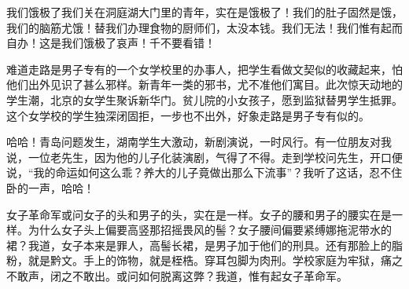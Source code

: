 我们饿极了我们关在洞庭湖大门里的青年，实在是饿极了！我们的肚子固然是饿，我们的脑筋尤饿！替我们办理食物的厨师们，太没本钱。我们无法！我们惟有起而自办！这是我们饿极了哀声！千不要看错！

难道走路是男子专有的一个女学校里的办事人，把学生看做文契似的收藏起来，怕他们出外见识了甚么邪样。新青年一类的邪书，尤不准他们寓目。此次惊天动地的学生潮，北京的女学生聚诉新华门。贫儿院的小女孩子，愿到监狱替男学生抵罪。这个女学校的学生独深闭固拒，一步也不出外，好象走路是男子专有似的。

哈哈！青岛问题发生，湖南学生大激动，新剧演说，一时风行。有一位朋友对我说，一位老先生，因为他的儿子化装演剧，气得了不得。走到学校问先生，开口便说，“我的命运如何这么乖？养大的儿子竟做出那么下流事”？我听了这话，忍不住卧的一声，哈哈！

女子革命军或问女子的头和男子的头，实在是一样。女子的腰和男子的腰实在是一样。为什么女子头上偏要高竖那招摇畏风的髻？女子腰间偏要紧缚娜拖泥带水的裙？我道，女子本来是罪人，高髻长裙，是男子加于他们的刑具。还有那脸上的脂粉，就是黔文。手上的饰物，就是桎梏。穿耳包脚为肉刑。学校家庭为牢狱，痛之不敢声，闭之不敢出。或问如何脱离这弊？我道，惟有起女子革命军。

